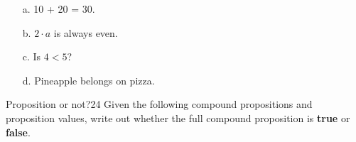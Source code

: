 \documentclass[a4paper,12pt]{book}
\begin{document}
    \begin{enumerate}
        \item[a.] 10 + 20 = 30.
            \iftoggle{answerkey}{ \begin{answer} Proposition, true \end{answer} }{}
        \item[b.] $2 \cdot a$ is always even.
            \iftoggle{answerkey}{ \begin{answer} Proposition, true \end{answer} }{}
        \item[c.] Is $4 < 5$?
            \iftoggle{answerkey}{ \begin{answer} Not a proposition \end{answer} }{}
        \item[d.] Pineapple belongs on pizza.
            \iftoggle{answerkey}{ \begin{answer} Proposition, true \end{answer} }{}
    \end{enumerate}

    \hrulefill

    \begin{answersheetquestion}{2}{Proposition or not?}{24}
        Given the following compound propositions and proposition values,
        write out whether the full compound proposition is \textbf{true} or \textbf{false}.
    \end{answersheetquestion}
\end{document}
